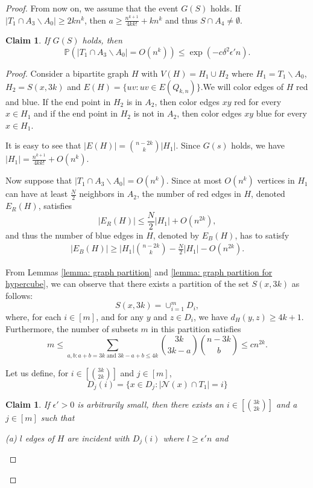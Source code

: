 \documentclass[reqno,11pt]{amsart}
\newtheorem{claim}[theorem]{Claim}
\renewcommand{\leq}{\leqslant}
\renewcommand{\geq}{\geqslant}
\begin{document}
\begin{proof}
From now on, we assume that the event $G(S)$ holds. If $|T_1\cap A_3 \backslash A_0| \geq 2kn^k$, then $a \geq \frac{n^{k+1}}{4kk!}+kn^k$ and thus $S \cap A_4 \neq \emptyset$.

\begin{claim} If $G(S)$ holds, then 
$$\mathbb{P}(|T_1\cap A_3 \backslash A_0| =O(n^k)) \leq \exp(-c\delta^2 \epsilon' n).$$
\end{claim}
\begin{proof} Consider a bipartite graph $H$ with $V(H)=H_1 \cup H_2$ where $H_1= T_1 \backslash A_0$, $H_2=S(x,3k)$ and $E(H)=\{uv: uv \in E(Q_{k,n})\}$.We will color edges of $H$ red and blue. If the end point in $H_2$ is in $A_2$, then color edges $xy$ red for every $x \in H_1$ and if the end point in $H_2$ is not in $A_2$, then color edges $xy$ blue for every $x \in H_1$.

It is easy to see that 
$|E(H)|=\binom{n-2k}{k}|H_1|$. Since $G(s)$ holds, we have $|H_1|=\frac{n^{k+1}}{4kk!}+O(n^k)$.

Now suppose that $|T_1 \cap A_3 \backslash A_0|=O(n^k)$. Since at most $O(n^k)$ vertices in $H_1$ can have at least $\frac{N}{2}$ neighbors in $A_2$, the number of red edges in $H$, denoted $E_R(H)$, satisfies 
$$|E_R(H)| \leq \frac{N}{2}|H_1|+O(n^{2k}),$$
and thus the number of blue edges in $H$, denoted by $E_B(H)$, has to satisfy
\begin{align} \label{eq: blue edges k}
    |E_B(H)| \geq |H_1|\binom{n-2k}{k}-\frac{N}{2}|H_1|-O(n^{2k}). 
\end{align}


From Lemmas \ref{lemma: graph partition} and \ref{lemma: graph partition for hypercube}, we can observe that there exists a partition of the set $S(x,3k)$ as follows:
$$S(x,3k)= \cup_{i=1}^m D_i,$$
where, for each $i \in [m]$, and for any $y$ and $z \in D_i$, we have $d_H(y,z) \geq 4k+1$. Furthermore, the number of subsets $m$ in this partition satisfies 
$$m \leq \sum_{a,b: a+b=3k \; \text{and} \; 3k-a+b \leq 4k}\binom{3k}{3k-a}\binom{n-3k}{b} \leq c n^{2k}.$$

Let us define, for $i \in [\binom{3k}{2k}]$ and $j \in [m]$,
$$D_j(i)=\{x \in D_j: |\mathcal{N}(x) \cap T_1|=i  \}$$

\begin{claim} If $ \epsilon' >0$ is arbitrarily small, then there exists an $i \in [\binom{3k}{2k}]$ and a $j \in [m]$ such that 

(a) $l$ edges of $H$ are incident with $D_j(i)$ where $l \geq \epsilon' n$ and 


\end{claim}
\end{proof}
\end{proof}
\end{document}
